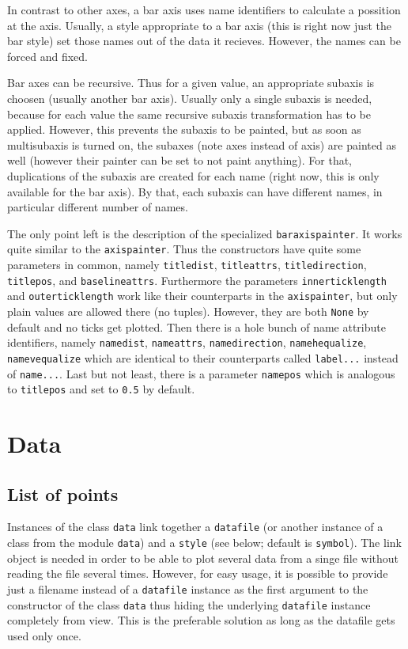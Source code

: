 In contrast to other axes, a bar axis uses name identifiers to
calculate a possition at the axis. Usually, a style appropriate to a
bar axis (this is right now just the bar style) set those names out of
the data it recieves. However, the names can be forced and fixed.

Bar axes can be recursive. Thus for a given value, an appropriate
subaxis is choosen (usually another bar axis). Usually only a single
subaxis is needed, because for each value the same recursive subaxis
transformation has to be applied. However, this prevents the subaxis
to be painted, but as soon as multisubaxis is turned on, the subaxes
(note axes instead of axis) are painted as well (however their painter
can be set to not paint anything). For that, duplications of the
subaxis are created for each name (right now, this is only available
for the bar axis). By that, each subaxis can have different names, in
particular different number of names.

The only point left is the description of the specialized
\verb|baraxispainter|. It works quite similar to the
\verb|axispainter|. Thus the constructors have quite some parameters
in common, namely \verb|titledist|, \verb|titleattrs|,
\verb|titledirection|, \verb|titlepos|, and \verb|baselineattrs|.
Furthermore the parameters \verb|innerticklength| and
\verb|outerticklength| work like their counterparts in the
\verb|axispainter|, but only plain values are allowed there (no
tuples). However, they are both \verb|None| by default and no ticks
get plotted. Then there is a hole bunch of name
attribute identifiers, namely \verb|namedist|, \verb|nameattrs|,
\verb|namedirection|, \verb|namehequalize|, \verb|namevequalize| which
are identical to their counterparts called \verb|label...| instead of
\verb|name...|. Last but not least, there is a parameter \verb|namepos|
which is analogous to \verb|titlepos| and set to \verb|0.5| by
default.

\section{Data}
\label{graph:data}

\subsection{List of points}

Instances of the class \verb|data| link together a \verb|datafile| (or
another instance of a class from the module \verb|data|) and a
\verb|style| (see below; default is \verb|symbol|). The link object is
needed in order to be able to plot several data from a singe file
without reading the file several times. However, for easy usage, it is
possible to provide just a filename instead of a \verb|datafile|
instance as the first argument to the constructor of the class
\verb|data| thus hiding the underlying \verb|datafile| instance
completely from view. This is the preferable solution as long as the
datafile gets used only once.

